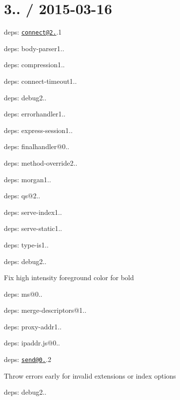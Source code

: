 {\ttfamily \section*{3.. / 2015-\/03-\/16 }}

{\ttfamily }

{\ttfamily 
\begin{DoxyItemize}
\item deps\+: \href{mailto:connect@2.29}{\tt connect@2.}.1
\begin{DoxyItemize}
\item deps\+: body-\/parser1..
\item deps\+: compression1..
\item deps\+: connect-\/timeout1..
\item deps\+: debug2..
\item deps\+: errorhandler1..
\item deps\+: express-\/session1..
\item deps\+: finalhandler@0..
\item deps\+: method-\/override2..
\item deps\+: morgan1..
\item deps\+: qs@2..
\item deps\+: serve-\/index1..
\item deps\+: serve-\/static1..
\item deps\+: type-\/is1..
\end{DoxyItemize}
\item deps\+: debug2..
\begin{DoxyItemize}
\item Fix high intensity foreground color for bold
\item deps\+: ms@0..
\end{DoxyItemize}
\item deps\+: merge-\/descriptors@1..
\item deps\+: proxy-\/addr1..
\begin{DoxyItemize}
\item deps\+: ipaddr.\+js@0..
\end{DoxyItemize}
\item deps\+: \href{mailto:send@0.12}{\tt send@0.}.2
\begin{DoxyItemize}
\item Throw errors early for invalid {\ttfamily extensions} or {\ttfamily index} options
\item deps\+: debug2..
\end{DoxyItemize}
\end{DoxyItemize}}

